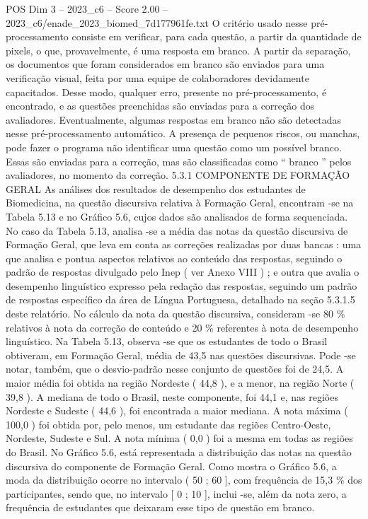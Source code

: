 \begin{textsample}{POS Dim 3 – 2023\_c6 – Score 2.00 – 2023\_c6/enade\_2023\_biomed\_7d177961fe.txt}
O critério usado nesse pré-processamento consiste em verificar, para cada questão, a partir da quantidade de pixels, o que, provavelmente, é uma resposta em branco.
A partir da separação, os documentos que foram considerados em branco são enviados para uma verificação visual, feita por uma equipe de colaboradores devidamente capacitados.
Desse modo, qualquer erro, presente no pré-processamento, é encontrado, e as questões preenchidas são enviadas para a correção dos avaliadores.
Eventualmente, algumas respostas em branco não são detectadas nesse pré-processamento automático.
A presença de pequenos riscos, ou manchas, pode fazer o programa não identificar uma questão como um possível branco.
Essas são enviadas para a correção, mas são classificadas como “ branco ” pelos avaliadores, no momento da correção. 5.3.1 COMPONENTE DE FORMAÇÃO GERAL As análises dos resultados de desempenho dos estudantes de Biomedicina, na questão discursiva relativa à Formação Geral, encontram -se na Tabela 5.13 e no Gráfico 5.6, cujos dados são analisados de forma sequenciada.
No caso da Tabela 5.13, analisa -se a média das notas da questão discursiva de Formação Geral, que leva em conta as correções realizadas por duas bancas : uma que analisa e pontua aspectos relativos ao conteúdo das respostas, seguindo o padrão de respostas divulgado pelo Inep ( ver Anexo VIII ) ; e outra que avalia o desempenho linguístico expresso pela redação das respostas, seguindo um padrão de respostas específico da área de Língua Portuguesa, detalhado na seção 5.3.1.5 deste relatório.
No cálculo da nota da questão discursiva, consideram -se 80 \% relativos à nota da correção de conteúdo e 20 \% referentes à nota de desempenho linguístico.
Na Tabela 5.13, observa -se que os estudantes de todo o Brasil obtiveram, em Formação Geral, média de 43,5 nas questões discursivas.
Pode -se notar, também, que o desvio-padrão nesse conjunto de questões foi de 24,5.
A maior média foi obtida na região Nordeste ( 44,8 ), e a menor, na região Norte ( 39,8 ).
A mediana de todo o Brasil, neste componente, foi 44,1 e, nas regiões Nordeste e Sudeste ( 44,6 ), foi encontrada a maior mediana.
A nota máxima ( 100,0 ) foi obtida por, pelo menos, um estudante das regiões Centro-Oeste, Nordeste, Sudeste e Sul.
A nota mínima ( 0,0 ) foi a mesma em todas as regiões do Brasil.
No Gráfico 5.6, está representada a distribuição das notas na questão discursiva do componente de Formação Geral.
Como mostra o Gráfico 5.6, a moda da distribuição ocorre no intervalo ( 50 ; 60 ], com frequência de 15,3 \% dos participantes, sendo que, no intervalo [ 0 ; 10 ], inclui -se, além da nota zero, a frequência de estudantes que deixaram esse tipo de questão em branco.

\end{textsample}
